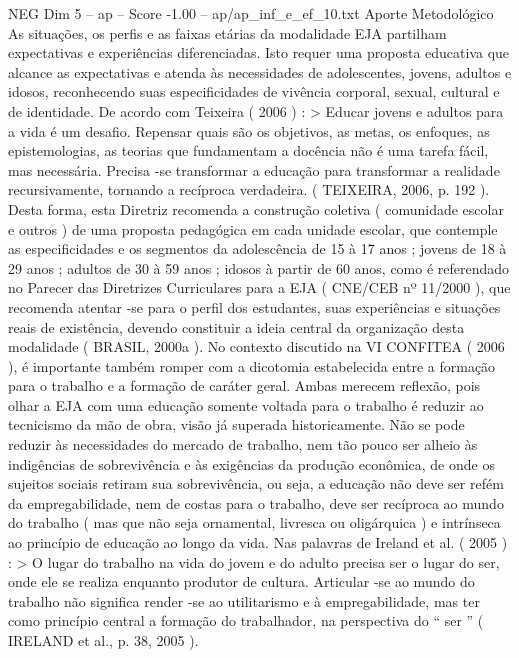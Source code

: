 \begin{textsample}{NEG Dim 5 – ap – Score -1.00 – ap/ap\_inf\_e\_ef\_10.txt}  \label{ex:f5_neg_129}
Aporte Metodológico As situações, os perfis e as faixas etárias da modalidade EJA partilham expectativas e experiências diferenciadas.
Isto requer uma proposta educativa que alcance as expectativas e atenda às necessidades de adolescentes, jovens, adultos e idosos, reconhecendo suas especificidades de vivência corporal, sexual, cultural e de identidade.
De acordo com Teixeira ( 2006 ) : > Educar jovens e adultos para a vida é um desafio.
Repensar quais são os objetivos, as metas, os enfoques, as epistemologias, as teorias que fundamentam a docência não é uma tarefa fácil, mas necessária.
Precisa -se transformar a educação para transformar a realidade recursivamente, tornando a recíproca verdadeira. ( TEIXEIRA, 2006, p. 192 ).
Desta forma, esta Diretriz recomenda a construção coletiva ( comunidade escolar e outros ) de uma proposta pedagógica em cada unidade escolar, que contemple as especificidades e os segmentos da adolescência de 15 à 17 anos ; jovens de 18 à 29 anos ; adultos de 30 à 59 anos ; idosos à partir de 60 anos, como é referendado no Parecer das Diretrizes Curriculares para a EJA ( CNE/CEB nº 11/2000 ), que recomenda atentar -se para o perfil dos estudantes, suas experiências e situações reais de existência, devendo constituir a ideia central da organização desta modalidade ( BRASIL, 2000a ).
No contexto discutido na VI CONFITEA ( 2006 ), é importante também romper com a dicotomia estabelecida entre a formação para o trabalho e a formação de caráter geral.
Ambas merecem reflexão, pois olhar a EJA com uma educação somente voltada para o trabalho é reduzir ao tecnicismo da mão de obra, visão já superada historicamente.
Não se pode reduzir às necessidades do mercado de trabalho, nem tão pouco ser alheio às indigências de sobrevivência e às exigências da produção econômica, de onde os sujeitos sociais retiram sua sobrevivência, ou seja, a educação não deve ser refém da empregabilidade, nem de costas para o trabalho, deve ser recíproca ao mundo do trabalho ( mas que não seja ornamental, livresca ou oligárquica ) e intrínseca ao princípio de educação ao longo da vida.
Nas palavras de Ireland et al. ( 2005 ) : > O lugar do trabalho na vida do jovem e do adulto precisa ser o lugar do ser, onde ele se realiza enquanto produtor de cultura.
Articular -se ao mundo do trabalho não significa render -se ao utilitarismo e à empregabilidade, mas ter como princípio central a formação do trabalhador, na perspectiva do “ ser ” ( IRELAND et al., p. 38, 2005 ).

\end{textsample}
